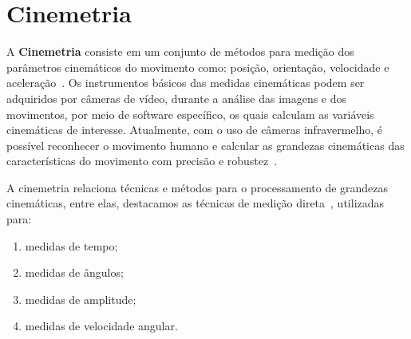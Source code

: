 \section{Cinemetria}
A \textbf{Cinemetria} consiste em um conjunto de métodos para medição dos parâmetros cinemáticos do movimento como: posição, orientação, velocidade e aceleração~\cite{biomecanica99}. Os instrumentos básicos das medidas cinemáticas podem ser adquiridos por câmeras de vídeo, durante a análise das imagens e dos movimentos, por meio de software específico, os quais calculam as variáveis cinemáticas de interesse. Atualmente, com o uso de câmeras infravermelho, é possível reconhecer o movimento humano e calcular as grandezas cinemáticas das características do movimento com precisão e robustez~\cite{gabel2012}.

A cinemetria relaciona técnicas e métodos para o processamento de grandezas cinemáticas, entre elas, destacamos as técnicas de medição direta~\cite{biomecanica99}, utilizadas para: 
\begin{enumerate}
	\item medidas de tempo;
	\item medidas de ângulos;
	\item medidas de amplitude;
	\item medidas de velocidade angular.
\end{enumerate}

% 


